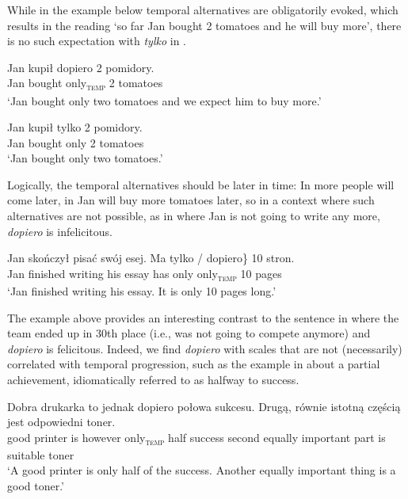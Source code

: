 \documentclass[output=paper,colorlinks,citecolor=brown]{langscibook}
\begin{document}
\noindent While in the example  below temporal alternatives are obligatorily evoked, which results in the reading `so far Jan bought 2 tomatoes and he will buy more', there is no such expectation with \textit{tylko} in .

\ea\label{ex:tom:46}
\gll Jan kupił dopiero 2 pomidory.\\
Jan bought only\textsubscript{\textsc{temp}} 2 tomatoes\\
\glt `Jan bought only two tomatoes and we expect him to buy more.’
\z 

\ea\label{ex:tom:47}
\gll Jan kupił tylko 2 pomidory.\\
Jan bought only 2 tomatoes\\
\glt `Jan bought only two tomatoes.’
\z 

\noindent Logically, the temporal alternatives should be later in time: In  more people will come later, in  Jan will buy more tomatoes later, so in a context where such alternatives are not possible, as in  where Jan is not going to write any more,  \textit{dopiero} is infelicitous.

\ea\label{ex:tom:48}
\gll Jan skończył pisać swój esej. Ma \minsp{\{} tylko / \minsp{\#} dopiero\} 10 stron.\\
Jan finished  writing his essay has {} only {} {} only\textsubscript{\textsc{temp}} 10 pages\\
\glt `Jan finished writing his essay. It is only 10 pages long.’
\z 

\noindent The example above provides an interesting contrast to the sentence in  where the team ended up in 30th place (i.e., was not going to compete anymore) and \textit{dopiero} is felicitous. Indeed, we find \textit{dopiero} with scales that are not (necessarily) correlated with temporal progression, such as the example in  about a partial achievement, idiomatically referred to as halfway to success.

\ea \label{ex:tom:printer-ex}   
\gll Dobra drukarka to jednak dopiero połowa sukcesu. Drugą, równie istotną częścią jest odpowiedni toner.\\ 
good printer is however only\textsubscript{\textsc{temp}} half         success second equally important part is suitable toner\\
\glt `A good printer is only half of the success. Another equally important thing is a good toner.’
\z 
\end{document}
